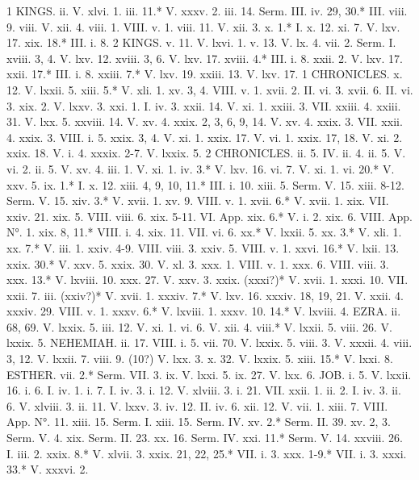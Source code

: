 1 KINGS.
ii.	V. xlvi. 1.
iii. 11.*	V. xxxv. 2.
iii. 14.	Serm. III.
iv. 29, 30.*	III. viii. 9.
viii.	V. xii. 4.
viii. 1.	VIII. v. 1.
viii. 11.	V. xii. 3.
x. 1.*	I. x. 12.
xi. 7.	V. lxv. 17.
xix. 18.*	III. i. 8.
2 KINGS.
v. 11.	V. lxvi. 1.
v. 13.	V. lx. 4.
vii. 2.	Serm. I.
xviii. 3, 4.	V. lxv. 12.
xviii. 3, 6.	V. lxv. 17.
xviii. 4.*	III. i. 8.
xxii. 2.	V. lxv. 17.
xxii. 17.*	III. i. 8.
xxiii. 7.*	V. lxv. 19.
xxiii. 13.	V. lxv. 17.
1 CHRONICLES.
x. 12.	V. lxxii. 5.
xiii. 5.*	V. xli. 1.
xv. 3, 4.	VIII. v. 1.
xvii. 2.	II. vi. 3.
xvii. 6.	II. vi. 3.
xix. 2.	V. lxxv. 3.
xxi. 1.	I. iv. 3.
xxii. 14.	V. xi. 1.
xxiii. 3.	VII. xxiii. 4.
xxiii. 31.	V. lxx. 5.
xxviii. 14.	V. xv. 4.
xxix. 2, 3, 6, 9, 14.	V. xv. 4.
xxix. 3.	VII. xxii. 4.
xxix. 3.	VIII. i. 5.
xxix. 3, 4.	V. xi. 1.
xxix. 17.	V. vi. 1.
xxix. 17, 18.	V. xi. 2.
xxix. 18.	V. i. 4.
xxxix. 2-7.	V. lxxix. 5.
2 CHRONICLES.
ii. 5.	IV. ii. 4.
ii. 5.	V. vi. 2.
ii. 5.	V. xv. 4.
iii. 1.	V. xi. 1.
iv. 3.*	V. lxv. 16.
vi. 7.	V. xi. 1.
vi. 20.*	V. xxv. 5.
ix. 1.*	I. x. 12.
xiii. 4, 9, 10, 11.*	III. i. 10.
xiii. 5.	Serm. V. 15.
xiii. 8-12.	Serm. V. 15.
xiv. 3.*	V. xvii. 1.
xv. 9.	VIII. v. 1.
xvii. 6.*	V. xvii. 1.
xix.	VII. xxiv. 21.
xix. 5.	VIII. viii. 6.
xix. 5-11.	VI. App.
xix. 6.*	V. i. 2.
xix. 6.	VIII. App. N°. 1.
xix. 8, 11.*	VIII. i. 4.
xix. 11.	VII. vi. 6.
xx.*	V. lxxii. 5.
xx. 3.*	V. xli. 1.
xx. 7.*	V. iii. 1.
xxiv. 4-9.	VIII. viii. 3.
xxiv. 5.	VIII. v. 1.
xxvi. 16.*	V. lxii. 13.
xxix. 30.*	V. xxv. 5.
xxix. 30.	V. xl. 3.
xxx. 1.	VIII. v. 1.
xxx. 6.	VIII. viii. 3.
xxx. 13.*	V. lxviii. 10.
xxx. 27.	V. xxv. 3.
xxix. (xxxi?)*	V. xvii. 1.
xxxi. 10.	VII. xxii. 7.
iii. (xxiv?)*	V. xvii. 1.
xxxiv. 7.*	V. lxv. 16.
xxxiv. 18, 19, 21.	V. xxii. 4.
xxxiv. 29.	VIII. v. 1.
xxxv. 6.*	V. lxviii. 1.
xxxv. 10. 14.*	V. lxviii. 4.
EZRA.
ii. 68, 69.	V. lxxix. 5.
iii. 12.	V. xi. 1.
vi. 6.	V. xii. 4.
viii.*	V. lxxii. 5.
viii. 26.	V. lxxix. 5.
NEHEMIAH.
ii. 17.	VIII. i. 5.
vii. 70.	V. lxxix. 5.
viii. 3.	V. xxxii. 4.
viii. 3, 12.	V. lxxii. 7.
viii. 9. (10?)	V. lxx. 3.
x. 32.	V. lxxix. 5.
xiii. 15.*	V. lxxi. 8.
ESTHER.
vii. 2.*	Serm. VII. 3.
ix.	V. lxxi. 5.
ix. 27.	V. lxx. 6.
JOB.
i. 5.	V. lxxii. 16.
i. 6.	I. iv. 1.
i. 7.	I. iv. 3.
i. 12.	V. xlviii. 3.
i. 21.	VII. xxii. 1.
ii. 2.	I. iv. 3.
ii. 6.	V. xlviii. 3.
ii. 11.	V. lxxv. 3.
iv. 12.	II. iv. 6.
xii. 12.	V. vii. 1.
xiii. 7.	VIII. App. N°. 11.
xiii. 15.	Serm. I.
xiii. 15.	Serm. IV.
xv. 2.*	Serm. II. 39.
xv. 2, 3.	Serm. V. 4.
xix.	Serm. II. 23.
xx. 16.	Serm. IV.
xxi. 11.*	Serm. V. 14.
xxviii. 26.	I. iii. 2.
xxix. 8.*	V. xlvii. 3.
xxix. 21, 22, 25.*	VII. i. 3.
xxx. 1-9.*	VII. i. 3.
xxxi. 33.*	V. xxxvi. 2.

